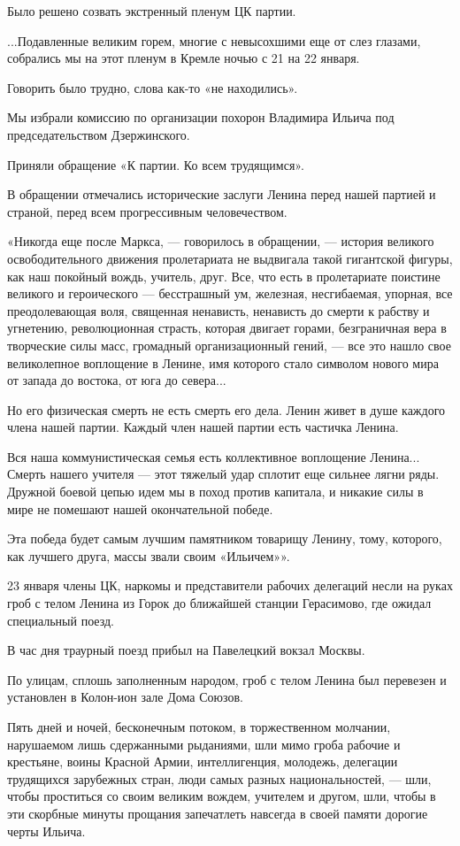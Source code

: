 \documentclass[12pt, a4paper, openany]{book}
\begin{document}
Было решено созвать экстренный пленум ЦК партии.

...Подавленные великим горем, многие с невысохшими еще от слез глазами, собрались мы на этот пленум в Кремле ночью с 21 на 22 января.

Говорить было трудно, слова как-то «не находились».

Мы избрали комиссию по организации похорон Владимира Ильича под председательством Дзержинского.

Приняли обращение «К партии. Ко всем трудящимся».

В обращении отмечались исторические заслуги Ленина перед нашей партией и страной, перед всем прогрессивным человечеством.

«Никогда еще после Маркса, — говорилось в обращении, — история великого освободительного движения пролетариата не выдвигала такой гигантской фигуры, как наш покойный вождь, учитель, друг. Все, что есть в пролетариате поистине великого и героического — бесстрашный ум, железная, несгибаемая, упорная, все преодолевающая воля, священная ненависть, ненависть до смерти к рабству и угнетению, революционная страсть, которая двигает горами, безграничная вера в творческие силы масс, громадный организационный гений, — все это нашло свое великолепное воплощение в Ленине, имя которого стало символом нового мира от запада до востока, от юга до севера...

Но его физическая смерть не есть смерть его дела. Ленин живет в душе каждого члена нашей партии. Каждый член нашей партии есть частичка Ленина.

Вся наша коммунистическая семья есть коллективное воплощение Ленина... Смерть нашего учителя — этот тяжелый удар сплотит еще сильнее лягни ряды. Дружной боевой цепью идем мы в поход против капитала, и никакие силы в мире не помешают нашей окончательной победе.

Эта победа будет самым лучшим памятником товарищу Ленину, тому, которого, как лучшего друга, массы звали своим «Ильичем»».

23 января члены ЦК, наркомы и представители рабочих делегаций несли на руках гроб с телом Ленина из Горок до ближайшей станции Герасимово, где ожидал специальный поезд.

В час дня траурный поезд прибыл на Павелецкий вокзал Москвы.

По улицам, сплошь заполненным народом, гроб с телом Ленина был перевезен и установлен в Колон-ион зале Дома Союзов.

Пять дней и ночей, бесконечным потоком, в торжественном молчании, нарушаемом лишь сдержанными рыданиями, шли мимо гроба рабочие и крестьяне, воины Красной Армии, интеллигенция, молодежь, делегации трудящихся зарубежных стран, люди самых разных национальностей, — шли, чтобы проститься со своим великим вождем, учителем и другом, шли, чтобы в эти скорбные минуты прощания запечатлеть навсегда в своей памяти дорогие черты Ильича.
\end{document}
